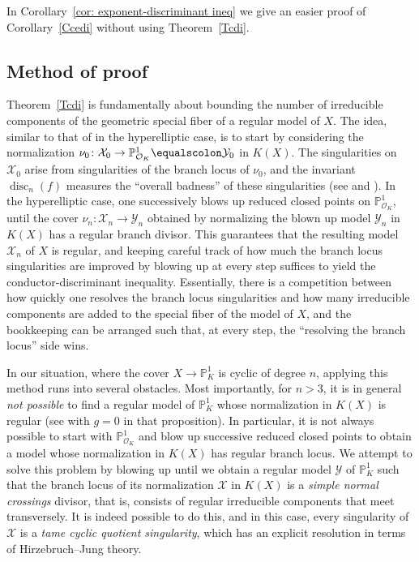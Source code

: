 \documentclass[12pt]{amsart}
\numberwithin{equation}{section}
\theoremstyle{definition}
\newcommand{\mc}[1]{\mathcal{#1}}
\newcommand{\proj}{\mathbb P}
\DeclareMathOperator{\disc}{disc}
\begin{document}
In Corollary~\ref{cor: exponent-discriminant ineq} we give an easier
proof of Corollary~\ref{Ccedi} without using Theorem~\ref{Tcdi}.

\subsection{Method of proof}\label{Smethod} Theorem~\ref{Tcdi} is fundamentally about bounding the number of
irreducible components of the geometric special fiber of a regular model of $X$.  The idea, similar
to that of \cite{OShyper_published} in the hyperelliptic case, is to
start by considering the normalization $\nu_0 \colon \mc{X}_0 \to
\proj^1_{\mc{O}_K}  \equalscolon \mc{Y}_0$ in $K(X)$.  The
singularities on $\mc{X}_0$ arise from singularities of the branch locus
of $\nu_0$, and the invariant $\disc_n(f)$ measures the ``overall badness'' of these singularities (see  and ).  In the hyperelliptic case, one successively
blows up reduced closed points on $\proj^1_{\mc{O}_K}$, until the
cover $\nu_n \colon \mc{X}_n \to
 \mc{Y}_n$ obtained by normalizing the blown up model $\mc{Y}_n$ in $K(X)$ has a regular branch divisor. This guarantees that the resulting model $\mc{X}_n$ of $X$ is regular, and
keeping careful track of how much the branch locus singularities are
improved by blowing up at every step suffices to yield the conductor-discriminant inequality.  Essentially, there is a competition between how quickly one resolves the branch locus singularities and how many irreducible components are added to the special fiber of the model of $X$, and the bookkeeping can be arranged such that, at every step, the ``resolving the branch locus'' side wins.

In our situation, where the cover $X \to \proj^1_K$ is cyclic of
degree $n$, applying this method runs into several obstacles.  Most importantly, for $n >
3$, it is in general \emph{not possible} to find a regular model of
$\proj^1_K$ whose normalization in $K(X)$ is regular (see
\cite[Proposition 6.6]{LL} with $g = 0$ in that proposition).  In
particular, it is not always possible to start with $\proj^1_{\mc{O}_K}$ and blow up successive reduced closed
points to obtain a model whose normalization in $K(X)$ has regular
branch locus.  We attempt to solve this problem by blowing up until we
obtain a regular model $\mc{Y}$ of $\proj^1_K$
such that the branch locus of its normalization $\mc{X}$ in $K(X)$ is a \emph{simple normal crossings} divisor, that is,
consists of regular irreducible components that meet transversely.  It
is indeed possible to do this, and in
this case, every singularity of $\mc{X}$ is a \emph{tame cyclic quotient singularity}, which has an explicit resolution in terms of
Hirzebruch--Jung theory.
\end{document}
